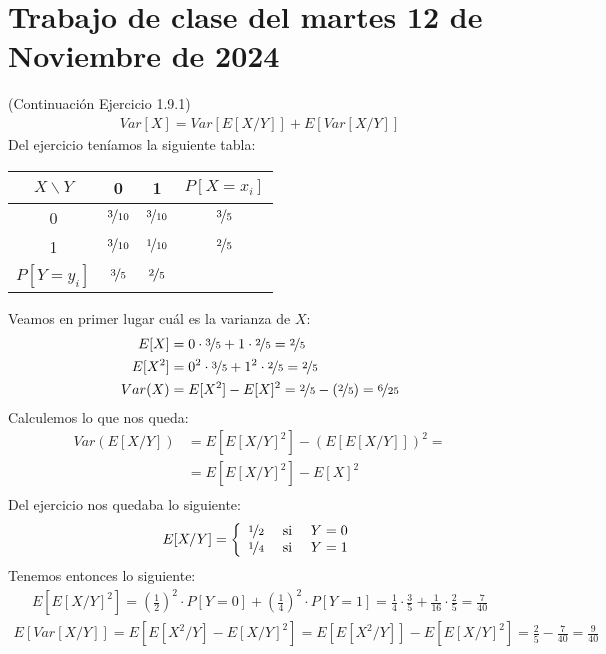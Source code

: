 \section{Trabajo de clase del martes 12 de Noviembre de 2024}

\begin{ejercicio}
    (Continuación Ejercicio 1.9.1) 
    \begin{align*}
        Var[X]=Var[E[X/Y]]+E[Var[X/Y]]
    \end{align*}
    Del ejercicio teníamos la siguiente tabla: 
    \begin{center}
        \begin{tabular}{c | c c | c}
            $X\backslash Y$ & 0 & 1 & $P[X=x_i]$\\
            \hline
            0 & $\nicefrac{3}{10}$ & $\nicefrac{3}{10}$ & $\nicefrac{3}{5}$\\
            1 & $\nicefrac{3}{10}$ & $ \nicefrac{1}{10}$ & $\nicefrac{2}{5}$\\
            \hline
            $P[Y=y_i]$ & $\nicefrac{3}{5}$ & $\nicefrac{2}{5}$ & \\
        \end{tabular}
    \end{center}
    Veamos en primer lugar cuál es la varianza de $X$:
    \begin{align*}
        E[X] &= 0 \cdot \nicefrac{3}{5} + 1 \cdot \nicefrac{2}{5} = \nicefrac{2}{5}\\
        E[X^2] &= 0^2 \cdot \nicefrac{3}{5} + 1^2 \cdot \nicefrac{2}{5} = \nicefrac{2}{5}\\
        Var(X) &= E[X^2]-E[X]^2 = \nicefrac{2}{5} - \left(\nicefrac{2}{5}\right) = \nicefrac{6}{25}
    \end{align*}
    Calculemos lo que nos queda:
    \begin{align*}
        Var(E[X/Y]) &= E[E[X/Y]^2] - (E[E[X/Y]])^2 =\\
        &= E[E[X/Y]^2] - E[X]^2\\
    \end{align*}
    Del ejercicio nos quedaba lo siguiente:
    \begin{gather*}
        E[X/Y] = \left\{
        \begin{array}{ccc}
            \nicefrac{1}{2} & \text{ si } & Y=0\\
            \nicefrac{1}{4} & \text{ si } & Y=1
        \end{array}
        \right.
    \end{gather*}
    Tenemos entonces lo siguiente:
    \begin{align*}
        E[E[X/Y]^2]=\left(\frac{1}{2}\right)^2 \cdot P[Y=0] + \left(\frac{1}{4}\right)^2 \cdot P[Y=1] = \frac{1}{4} \cdot \frac{3}{5} + \frac{1}{16} \cdot \frac{2}{5} = \frac{7}{40} 
    \end{align*}
    \begin{align*}
        E[Var[X/Y]]=E[E[X^2/Y] - E[X/Y]^2] = E[E[X^2/Y]] - E[E[X/Y]^2] = \frac{2}{5} - \frac{7}{40} = \frac{9}{40}
    \end{align*}
\end{ejercicio}

